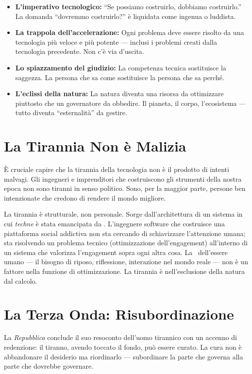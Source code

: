 \begin{itemize}
\item \textbf{L'imperativo tecnologico:} ``Se possiamo costruirlo, dobbiamo
  costruirlo.'' La domanda ``dovremmo costruirlo?'' \`e liquidata come
  ingenua o luddista.
\item \textbf{La trappola dell'accelerazione:} Ogni problema deve essere
  risolto da una tecnologia pi\`u veloce e pi\`u potente --- inclusi i
  problemi creati dalla tecnologia precedente. Non c'\`e via d'uscita.
\item \textbf{Lo spiazzamento del giudizio:} La competenza tecnica
  sostituisce la saggezza. La persona che sa come sostituisce la persona
  che sa perch\'e.
\item \textbf{L'eclissi della natura:} La natura diventa una risorsa da
  ottimizzare piuttosto che un governatore da obbedire. Il pianeta, il
  corpo, l'ecosistema --- tutto diventa ``esternalit\`a'' da gestire.
\end{itemize}

\section{La Tirannia Non \`e Malizia}

\`E cruciale capire che la tirannia della tecnologia non \`e il prodotto
di intenti malvagi. Gli ingegneri e imprenditori che costruiscono gli
strumenti della nostra epoca non sono tiranni in senso politico. Sono,
per la maggior parte, persone ben intenzionate che credono di rendere il
mondo migliore.

La tirannia \`e strutturale, non personale. Sorge dall'architettura di
un sistema in cui \emph{techne} \`e stata emancipata da \physis.
L'ingegnere software che costruisce una piattaforma social addictiva non
sta cercando di schiavizzare l'attenzione umana; sta risolvendo un
problema tecnico (ottimizzazione dell'engagement) all'interno di un
sistema che valorizza l'engagement sopra ogni altra cosa. La \physis\
dell'essere umano --- il bisogno di riposo, riflessione, interazione nel
mondo reale --- non \`e un fattore nella funzione di ottimizzazione. La
tirannia \`e nell'esclusione della natura dal calcolo.

\section{La Terza Onda: Risubordinazione}

La \emph{Repubblica} conclude il suo resoconto dell'uomo tirannico con
un accenno di redenzione: il tiranno, avendo toccato il fondo, pu\`o
essere curato. La cura non \`e abbandonare il desiderio ma riordinarlo
--- subordinare la parte che governa alla parte che dovrebbe governare.

